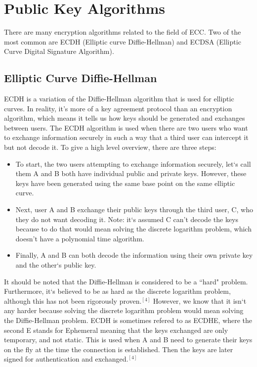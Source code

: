 \documentclass[conference]{IEEEtran}
\begin{document}
\section{Public Key Algorithms}
There are many encryption algorithms related to the field of ECC.  Two of the most common are ECDH (Elliptic curve Diffie-Hellman) and ECDSA (Elliptic Curve Digital Signature Algorithm).  

\subsection{Elliptic Curve Diffie-Hellman}
ECDH is a variation of the Diffie-Hellman algorithm that is used for elliptic curves.  In reality, it's more of a key agreement protocol than an encryption algorithm, which means it tells us how keys should be generated and exchanges between users.  The ECDH algorithm is used when there are two users who want to exchange information securely in such a way that a third user can intercept it but not decode it.  To give a high level overview, there are three steps: 
\begin{itemize}
\item To start, the two users attempting to exchange information securely, let`s call them A and B both have individual public and private keys.  However, these keys have been generated using the same base point on the same elliptic curve.  

\item Next, user A and B exchange their public keys through the third user, C, who they do not want decoding it.  Note: it`s assumed C can't decode the keys because to do that would mean solving the discrete logarithm problem, which doesn't have a polynomial time algorithm.  

\item Finally, A and B can both decode the information using their own private key and the other`s public key.  
\end{itemize}

It should be noted that the Diffie-Hellman is considered to be a ``hard" problem.  Furthermore, it`s believed to be as hard as the discrete logarithm problem, although this has not been rigorously proven.$^{[4]}$  However, we know that it isn`t any harder because solving the discrete logarithm problem would mean solving the Diffie-Hellman problem.  ECDH is sometimes refered to as ECDHE, where the second E stands for Ephemeral meaning that the keys exchanged are only temporary, and not static.  This is used when A and B need to generate their keys on the fly at the time the connection is established.  Then the keys are later signed for authentication and exchanged.$^{[4]}$  
\end{document}
